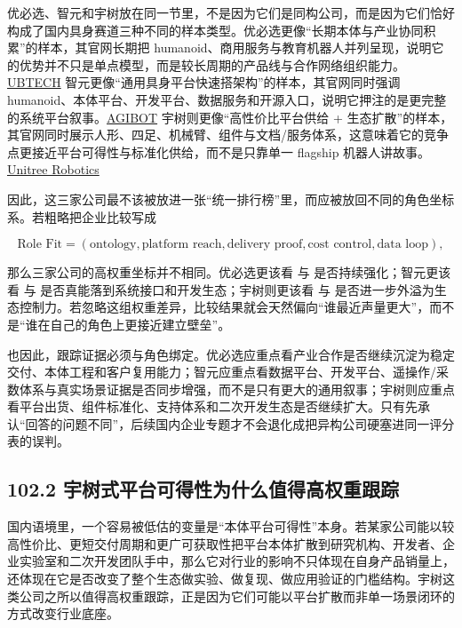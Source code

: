 优必选、智元和宇树放在同一节里，不是因为它们是同构公司，而是因为它们恰好构成了国内具身赛道三种不同的样本类型。优必选更像“长期本体与产业协同积累”的样本，其官网长期把 humanoid、商用服务与教育机器人并列呈现，说明它的优势并不只是单点模型，而是较长周期的产品线与合作网络组织能力。\href{https://www.ubtrobot.com/}{UBTECH} 智元更像“通用具身平台快速搭架构”的样本，其官网同时强调 humanoid、本体平台、开发平台、数据服务和开源入口，说明它押注的是更完整的系统平台叙事。\href{https://www.agibot.com/}{AGIBOT} 宇树则更像“高性价比平台供给 + 生态扩散”的样本，其官网同时展示人形、四足、机械臂、组件与文档/服务体系，这意味着它的竞争点更接近平台可得性与标准化供给，而不是只靠单一 flagship 机器人讲故事。\href{https://www.unitree.com/}{Unitree Robotics}

因此，这三家公司最不该被放进一张“统一排行榜”里，而应被放回不同的角色坐标系。若粗略把企业比较写成

\begingroup
\scriptsize
\begin{equation*}
\text{Role Fit} = (\text{ontology}, \text{platform reach}, \text{delivery proof}, \text{cost control}, \text{data loop}),
\end{equation*}
\endgroup

那么三家公司的高权重坐标并不相同。优必选更该看 \texttt{} 与 \texttt{} 是否持续强化；智元更该看 \texttt{} 与 \texttt{} 是否真能落到系统接口和开发生态；宇树则更该看 \texttt{} 与 \texttt{} 是否进一步外溢为生态控制力。若忽略这组权重差异，比较结果就会天然偏向“谁最近声量更大”，而不是“谁在自己的角色上更接近建立壁垒”。

也因此，跟踪证据必须与角色绑定。优必选应重点看产业合作是否继续沉淀为稳定交付、本体工程和客户复用能力；智元应重点看数据平台、开发平台、遥操作/采数体系与真实场景证据是否同步增强，而不是只有更大的通用叙事；宇树则应重点看平台出货、组件标准化、支持体系和二次开发生态是否继续扩大。只有先承认“回答的问题不同”，后续国内企业专题才不会退化成把异构公司硬塞进同一评分表的误判。

\subsection*{102.2 宇树式平台可得性为什么值得高权重跟踪}


国内语境里，一个容易被低估的变量是“本体平台可得性”本身。若某家公司能以较高性价比、更短交付周期和更广可获取性把平台本体扩散到研究机构、开发者、企业实验室和二次开发团队手中，那么它对行业的影响不只体现在自身产品销量上，还体现在它是否改变了整个生态做实验、做复现、做应用验证的门槛结构。宇树这类公司之所以值得高权重跟踪，正是因为它们可能以平台扩散而非单一场景闭环的方式改变行业底座。


